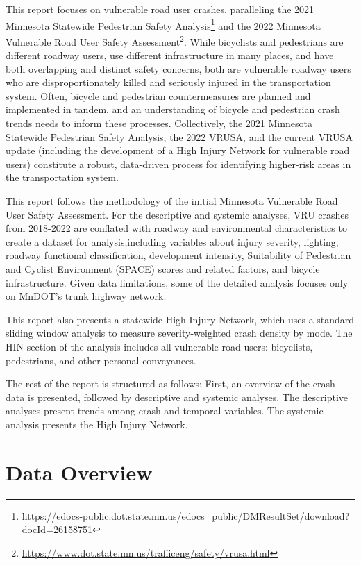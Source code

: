 \documentclass[
  letterpaper,
]{scrbook}
\begin{document}
This report focuses on vulnerable road user crashes, paralleling the
2021 Minnesota Statewide Pedestrian Safety Analysis\footnote{\url{https://edocs-public.dot.state.mn.us/edocs_public/DMResultSet/download?docId=26158751}}
and the 2022 Minnesota Vulnerable Road User Safety
Assessment\footnote{\url{https://www.dot.state.mn.us/trafficeng/safety/vrusa.html}}.
While bicyclists and pedestrians are different roadway users, use
different infrastructure in many places, and have both overlapping and
distinct safety concerns, both are vulnerable roadway users who are
disproportionately killed and seriously injured in the transportation
system. Often, bicycle and pedestrian countermeasures are planned and
implemented in tandem, and an understanding of bicycle and pedestrian
crash trends needs to inform these processes. Collectively, the 2021
Minnesota Statewide Pedestrian Safety Analysis, the 2022 VRUSA, and the
current VRUSA update (including the development of a High Injury Network
for vulnerable road users) constitute a robust, data-driven process for
identifying higher-risk areas in the transportation system.

This report follows the methodology of the initial Minnesota Vulnerable
Road User Safety Assessment. For the descriptive and systemic analyses,
VRU crashes from 2018-2022 are conflated with roadway and environmental
characteristics to create a dataset for analysis,including variables
about injury severity, lighting, roadway functional classification,
development intensity, Suitability of Pedestrian and Cyclist Environment
(SPACE) scores and related factors, and bicycle infrastructure. Given
data limitations, some of the detailed analysis focuses only on MnDOT's
trunk highway network.

This report also presents a statewide High Injury Network, which uses a
standard sliding window analysis to measure severity-weighted crash
density by mode. The HIN section of the analysis includes all vulnerable
road users: bicyclists, pedestrians, and other personal conveyances.

The rest of the report is structured as follows: First, an overview of
the crash data is presented, followed by descriptive and systemic
analyses. The descriptive analyses present trends among crash and
temporal variables. The systemic analysis presents the High Injury
Network.

\hypertarget{data-overview}{%
\section{Data Overview}\label{data-overview}}
\end{document}
